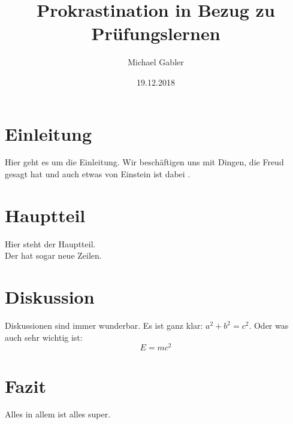 \documentclass{article}
\begin{document}
	\author{Michael Gabler}
	\title{Prokrastination in Bezug zu Prüfungslernen}
	\date{19.12.2018}
	\maketitle
	
	\newpage
	
	\tableofcontents
	
	\newpage
	
	\section{Einleitung}
	Hier geht es um die Einleitung. Wir beschäftigen uns mit Dingen, die Freud gesagt hat \cite{freud1955standard} und auch etwas von Einstein ist dabei \cite{einstein1905molekularkinetischen}.
	
	\section{Hauptteil}
	Hier steht der Hauptteil.
	\\
	Der hat sogar neue Zeilen.
	
	\section{Diskussion}
	Diskussionen sind immer wunderbar. Es ist ganz klar: $a^2 + b^2 = c^2$. Oder was auch sehr wichtig ist:
	\begin{equation}
	E = mc^2
	\end{equation}
	
	\section{Fazit}
	Alles in allem ist alles super.
	
	\newpage
	\printbibliography
	
\end{document}
